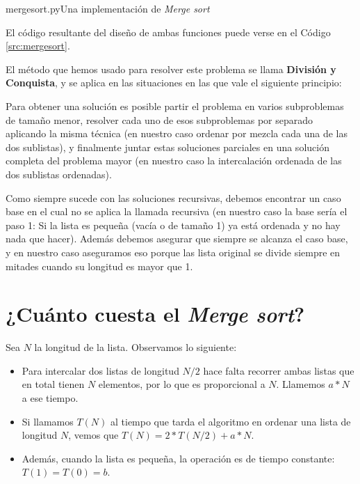 \begin{codigo}{mergesort.py}{Una implementación de {\it Merge sort}}

\label{src:mergesort}
\end{codigo}

El código resultante del diseño de ambas funciones puede verse en el Código
\ref{src:mergesort}.

\begin{sabias_que}
El método que hemos usado para resolver este problema se llama {\bf División y
Conquista}, y se aplica en las situaciones en las que vale el siguiente
principio:

Para obtener una solución es posible partir el problema en varios subproblemas
de tamaño menor, resolver cada uno de esos subproblemas por separado aplicando
la misma técnica (en nuestro caso ordenar por mezcla cada una de las dos
sublistas), y finalmente juntar estas soluciones parciales en una solución
completa del problema mayor (en nuestro caso la intercalación ordenada de las
dos sublistas ordenadas).

Como siempre sucede con las soluciones recursivas, debemos encontrar un caso
base en el cual no se aplica la llamada recursiva (en nuestro caso la base
sería el paso 1: Si la lista es pequeña (vacía o de tamaño 1) ya está ordenada
y no hay nada que hacer). Además debemos asegurar que siempre se alcanza el
caso base, y en nuestro caso aseguramos eso porque las lista original se divide
siempre en mitades cuando su longitud es mayor que 1.
\end{sabias_que}

\section{¿Cuánto cuesta el {\it Merge sort}?}
Sea $N$ la longitud de la lista. Observamos lo siguiente:
\begin{itemize}

\item Para intercalar dos listas de longitud $N/2$ hace falta recorrer
ambas listas que en total tienen $N$ elementos, por lo que es proporcional
a $N$. Llamemos $a * N$ a ese tiempo.

\item Si llamamos $T(N)$ al tiempo que tarda el algoritmo en ordenar
una lista de longitud $N$, vemos que $T(N) = 2 * T(N/2) + a * N$.

\item Además, cuando la lista es pequeña, la operación es de tiempo
constante: $T(1) = T(0) = b$.
\end{itemize}

